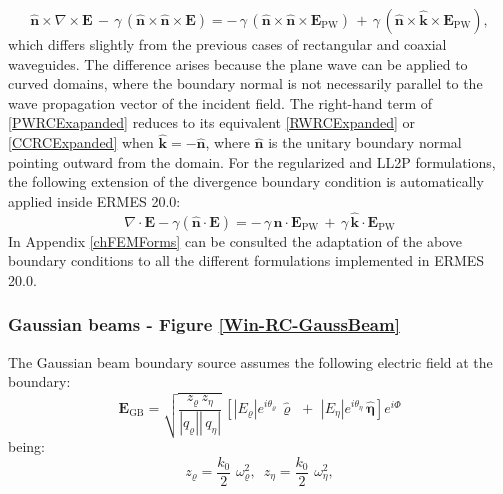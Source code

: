 \begin{equation}\label{PWRCExapanded}
	\mathbf{\hat{n}}\times\nabla\times\mathbf{E}\, - \,\gamma\,(\mathbf{\hat{n}}\times\mathbf{\hat{n}}\times\mathbf{E}) = - \,\gamma\,(\mathbf{\hat{n}}\times\mathbf{\hat{n}}\times\mathbf{E}_{\text{PW}})\, + \,\gamma\,(\mathbf{\hat{n}}\times\mathbf{\hat{k}}\times\mathbf{E}_{\text{PW}}),
\end{equation}
which differs slightly from the previous cases of rectangular and coaxial waveguides. The difference arises because the plane wave can be applied to curved domains, where the boundary normal is not necessarily parallel to the wave propagation vector of the incident field. The right-hand term of \eqref{PWRCExapanded} reduces to its equivalent \eqref{RWRCExpanded} or \eqref{CCRCExpanded} when $\mathbf{\hat{k}} = -\mathbf{\hat{n}}$, where $\mathbf{\hat{n}}$ is the unitary boundary normal pointing outward from the domain. For the regularized and LL2P formulations, the following extension of the divergence boundary condition is automatically applied inside ERMES 20.0:
\begin{equation}\label{PWRCDivExapanded}
	\nabla\cdot\mathbf{E} - \gamma\left(\mathbf{\hat{n}}\cdot\mathbf{E}\right) = -\,\gamma\, \mathbf{\hat{n}}\cdot\mathbf{E}_{\text{PW}}\, + \,\gamma\,\mathbf{\hat{k}}\cdot\mathbf{E}_{\text{PW}}
\end{equation}
In Appendix \ref{chFEMForms} can be consulted the adaptation of the above boundary conditions to all the different formulations implemented in ERMES 20.0.

\subsubsection{Gaussian beams - Figure \ref{Win-RC-GaussBeam}}\label{bsGaussBeam}

The Gaussian beam boundary source assumes the following electric field at the boundary:
\begin{equation}\label{EGB}
	\mathbf{E}_{\text{GB}} = \sqrt{\frac{z_{\varrho}\,z_{\eta}}{|q_{\varrho}||\,q_{\eta}|}}\,\left[|E_{\varrho}|e^{i\theta_{\varrho}}\,\mathbf{\hat{\varrho}}\,\,+\,\,|E_{\eta}|e^{i\theta_{\eta}}\,\mathbf{\hat{\eta}}\right]e^{i\Phi}
\end{equation}
being:
\begin{equation}\label{EGB-zs}
    z_{\varrho} = \dfrac{k_{0}}{2}\,\,\omega^{2}_{\varrho}, \,\,\, z_{\eta} = \dfrac{k_{0}}{2}\,\,\omega^{2}_{\eta},
\end{equation}

